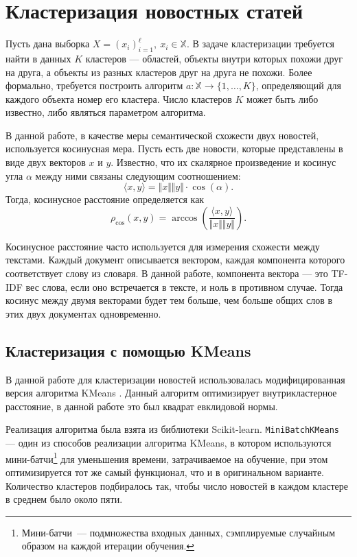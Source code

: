 \documentclass[a4paper, 14pt]{extarticle}
\begin{document}
\section{Кластеризация новостных статей}
Пусть дана выборка $X = (x_i)_{i=1}^{\ell}, \ x_i \in \mathbb{X}$. В задаче кластеризации требуется найти в данных
$K$ кластеров --- областей, объекты внутри которых похожи друг на друга, а объекты из разных кластеров друг на друга не похожи.
Более формально, требуется построить алгоритм $a : \mathbb{X} \to \{1, \dots, K\}$, определяющий для каждого объекта номер его кластера.
Число кластеров $K$ может быть либо известно, либо являться параметром алгоритма.

В данной работе, в качестве меры семантической схожести двух новостей, используется косинусная мера.
Пусть есть две новости, которые представлены в виде двух векторов $x$ и $y$. Известно, что их скалярное произведение
и косинус угла $\alpha$ между ними связаны следующим соотношением:
$$
\langle x,y \rangle = \Vert x \Vert \Vert y \Vert \cdot \cos(\alpha).
$$
Тогда, косинусное расстояние определяется как
$$
\rho_{\cos}(x, y) = \arccos\left(\frac{\langle x,y \rangle}{\Vert x \Vert \Vert y \Vert} \right).
$$

Косинусное расстояние часто используется для измерения схожести между текстами.
Каждый документ описывается вектором, каждая компонента которого соответствует слову из словаря. В данной работе, компонента
вектора --- это TF-IDF вес слова, если оно встречается в тексте, и ноль в противном случае.
Тогда косинус между двумя векторами будет тем больше, чем больше общих слов в этих двух документах одновременно.

\subsection{Кластеризация с помощью KMeans}
В данной работе для кластеризации новостей использовалась модифицированная версия алгоритма KMeans \cite{macqueen1967}. Данный алгоритм 
оптимизирует внутрикластерное расстояние, в данной работе это был квадрат евклидовой нормы.

Реализация алгоритма была взята из библиотеки Scikit-learn. \verb|MiniBatchKMeans| --- один из способов реализации алгоритма KMeans, в котором 
используются мини-батчи\footnote{Мини-батчи~--- подмножества входных данных, сэмплируемые случайным образом на каждой итерации обучения.}
для уменьшения времени, затрачиваемое на обучение, при этом оптимизируется тот же самый функционал, что и в оригинальном варианте. Количество 
кластеров подбиралось так, чтобы число новостей в каждом кластере в среднем было около пяти.
\end{document}
